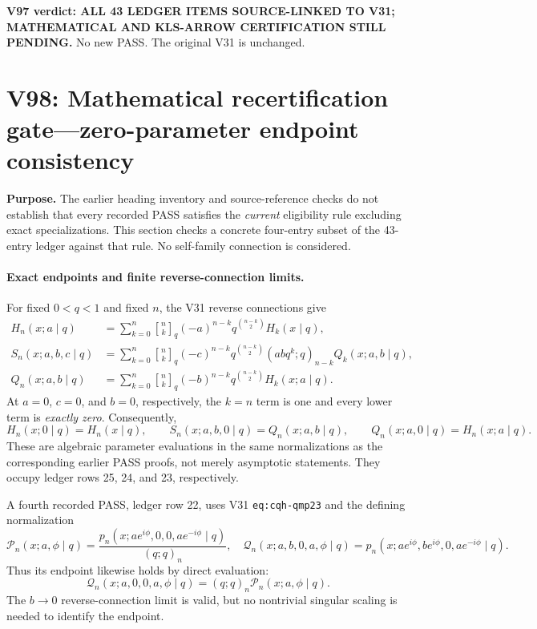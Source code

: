 \documentclass[11pt]{article}
\begin{document}
\noindent\textbf{V97 verdict: ALL 43 LEDGER ITEMS SOURCE-LINKED TO V31; MATHEMATICAL AND KLS-ARROW CERTIFICATION STILL PENDING.} No new PASS. The original V31 is unchanged.


\section{V98: Mathematical recertification gate---zero-parameter endpoint consistency}
\noindent\textbf{Purpose.} The earlier heading inventory and source-reference checks do not establish that every recorded PASS satisfies the \emph{current} eligibility rule excluding exact specializations. This section checks a concrete four-entry subset of the 43-entry ledger against that rule. No self-family connection is considered.

\paragraph{Exact endpoints and finite reverse-connection limits.}
For fixed $0<q<1$ and fixed $n$, the V31 reverse connections give
\begin{align}
 H_n(x;a\mid q)&=\sum_{k=0}^n {n\brack k}_q(-a)^{n-k}q^{\binom{n-k}{2}}H_k(x\mid q),\\
 S_n(x;a,b,c\mid q)&=\sum_{k=0}^n {n\brack k}_q(-c)^{n-k}q^{\binom{n-k}{2}}(abq^k;q)_{n-k}Q_k(x;a,b\mid q),\\
 Q_n(x;a,b\mid q)&=\sum_{k=0}^n {n\brack k}_q(-b)^{n-k}q^{\binom{n-k}{2}}H_k(x;a\mid q).
\end{align}
At $a=0$, $c=0$, and $b=0$, respectively, the $k=n$ term is one and every lower term is \emph{exactly zero}. Consequently,
\begin{equation}\label{eq:v98-exact-endpoints}
 H_n(x;0\mid q)=H_n(x\mid q),\qquad
 S_n(x;a,b,0\mid q)=Q_n(x;a,b\mid q),\qquad
 Q_n(x;a,0\mid q)=H_n(x;a\mid q).
\end{equation}
These are algebraic parameter evaluations in the same normalizations as the corresponding earlier PASS proofs, not merely asymptotic statements. They occupy ledger rows 25, 24, and 23, respectively.

A fourth recorded PASS, ledger row 22, uses V31 \texttt{eq:cqh-qmp23} and the defining normalization
\[
 \mathscr P_n(x;a,\phi\mid q)=\frac{p_n(x;ae^{i\phi},0,0,ae^{-i\phi}\mid q)}{(q;q)_n},\quad
 \mathscr Q_n(x;a,b,0,a,\phi\mid q)=p_n(x;ae^{i\phi},be^{i\phi},0,ae^{-i\phi}\mid q).
\]
Thus its endpoint likewise holds by direct evaluation:
\begin{equation}\label{eq:v98-qmp-exact}
 \mathscr Q_n(x;a,0,0,a,\phi\mid q)=(q;q)_n\mathscr P_n(x;a,\phi\mid q).
\end{equation}
The $b\to0$ reverse-connection limit is valid, but no nontrivial singular scaling is needed to identify the endpoint.
\end{document}
